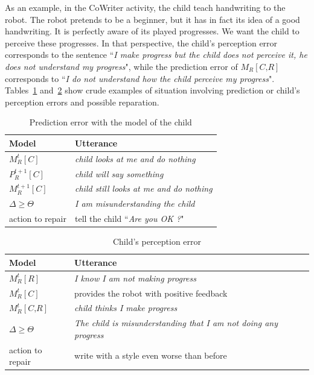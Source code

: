 \documentclass[10pt,a4paper]{article}
\begin{document}
As an example, in the CoWriter activity, the child teach handwriting to the robot. The robot pretends to be a beginner, but it has in fact its idea of a good handwriting. It is perfectly aware of its played progresses. We want the child to perceive these progresses. In that perspective, the child's perception error corresponds to the sentence ``\textit{I make progress but the child does not perceive it, he does not understand my progress}", while the prediction error of $M_R\left[\textit{C,R}\right]$ corresponds to ``\textit{I do not understand how the child perceive my progress}". Tables~\ref{pred_child} and~\ref{child_err} show crude examples of situation involving prediction or child's perception errors and possible reparation.

\begin{table}[!]
\centering
\renewcommand{\arraystretch}{1.5}
\begin{tabular}{|l|l|}
\hline
\textbf{Model} & \textbf{Utterance}\\
\hline
$M^t_R\left[\textit{C}\right]$ & \textit{child looks at me and do nothing}\\
\hline
$P^{t+1}_R\left[\textit{C}\right]$ & \textit{child will say something}\\
\hline
$M^{t+1}_R\left[\textit{C}\right]$ & \textit{child still looks at me and do nothing}\\
\hline
$\Delta \geq \Theta$ & \textit{I am misunderstanding the child}\\
\hline
action to repair & tell the child ``\textit{Are you OK ?}"\\
\hline
\end{tabular}
\caption{Prediction error with the model of the child}
\label{pred_child}
\end{table}

\begin{table}[!]
\centering
\renewcommand{\arraystretch}{1.5}
\begin{tabular}{|l|l|}
\hline
\textbf{Model} & \textbf{Utterance}\\
\hline
$M^t_R\left[\textit{R}\right]$ & \textit{I know I am not making progress}\\
\hline
$M^{t}_R\left[\textit{C}\right]$ & provides the robot with positive feedback\\
\hline
$M^{t}_R\left[\textit{C,R}\right]$ & \textit{child thinks I make progress}\\
\hline
$\Delta \geq \Theta$ & \textit{The child is misunderstanding that I am not doing any progress}\\
\hline
action to repair & write with a style even worse than before\\
\hline
\end{tabular}
\caption{Child's perception error}
\label{child_err}
\end{table}
\end{document}
